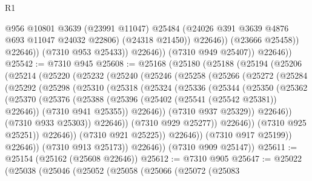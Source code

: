 \begin{lexlean}{R1}
\begin{coremodule}
                            @956
                            @10801
                            @3639
                            (@23991 @11047)
                            @25484
                            (@24026 @391 @3639 @4876 @693 @11047 @24032 @22806)
                            (@24318 @21450))
                          @22646))
                      (@23666 @25458))
                    @22646))
                (@7310 @953 @25433))
              @22646))
          (@7310 @949 @25407))
        @22646))
@25542 := @7310 @945
@25608 := @25168
    (@25180
      (@25188
        (@25194
          (@25206
            (@25214
              (@25220
                (@25232
                  (@25240
                    (@25246
                      (@25258
                        (@25266
                          (@25272
                            (@25284
                              (@25292
                                (@25298
                                  (@25310
                                    (@25318
                                      (@25324
                                        (@25336
                                          (@25344
                                            (@25350
                                              (@25362
                                                (@25370
                                                  (@25376
                                                    (@25388
                                                      (@25396
                                                        (@25402 (@25541 (@25542 @25381)) @22646))
                                                      (@7310 @941 @25355))
                                                    @22646))
                                                (@7310 @937 @25329))
                                              @22646))
                                          (@7310 @933 @25303))
                                        @22646))
                                    (@7310 @929 @25277))
                                  @22646))
                              (@7310 @925 @25251))
                            @22646))
                        (@7310 @921 @25225))
                      @22646))
                  (@7310 @917 @25199))
                @22646))
            (@7310 @913 @25173))
          @22646))
      (@7310 @909 @25147))
@25611 := @25154 (@25162 (@25608 @22646))
@25612 := @7310 @905
@25647 := @25022
    (@25038
      (@25046
        (@25052
          (@25058
            (@25066
              (@25072
                (@25083

\end{coremodule}
\end{lexlean}
